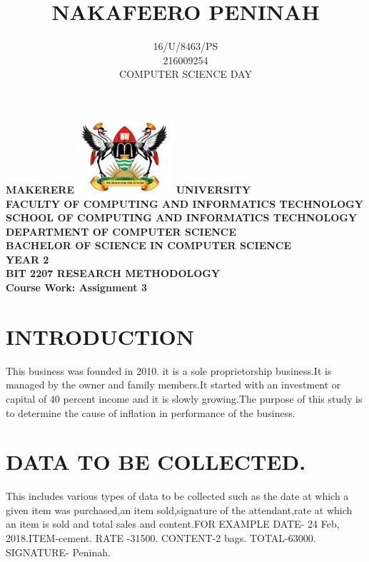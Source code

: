 \documentclass[12pt]{article}
\begin{document}
\begin{Huge}
\begin{center}
\begin{normalsize}
\textbf{MAKERERE \includegraphics[scale=0.5]{logo} UNIVERSITY }\\


\textbf{FACULTY OF COMPUTING AND INFORMATICS TECHNOLOGY} \\
\textbf{SCHOOL OF COMPUTING AND INFORMATICS TECHNOLOGY} \\
\textbf{DEPARTMENT OF COMPUTER SCIENCE} \\
\textbf{BACHELOR OF SCIENCE IN COMPUTER SCIENCE} \\
\textbf{YEAR 2} \\
\textbf{BIT 2207 RESEARCH METHODOLOGY} \\
\textbf{Course Work: Assignment 3}\\
\end{normalsize}
\end{center}
\end{Huge}

\title{\textbf{NAKAFEERO PENINAH}}
\author{16/U/8463/PS\\216009254\\COMPUTER SCIENCE DAY}
\date{}

\maketitle

\section{INTRODUCTION} 
   This business was founded in 2010. it is a sole proprietorship business.It is managed by the owner and family members.It started with an investment or capital of 40 percent income and it is slowly growing.The purpose of this study is to determine the cause of inflation in performance of the business.  

\section{DATA TO BE COLLECTED.}
This includes various types of data to be collected such as the date at which a given item was purchased,an item sold,signature of the attendant,rate at which an item is sold and total  sales and content.FOR EXAMPLE DATE- 24 Feb, 2018.ITEM-cement. RATE -31500. CONTENT-2 bags. TOTAL-63000. SIGNATURE- Peninah.
\end{document}
